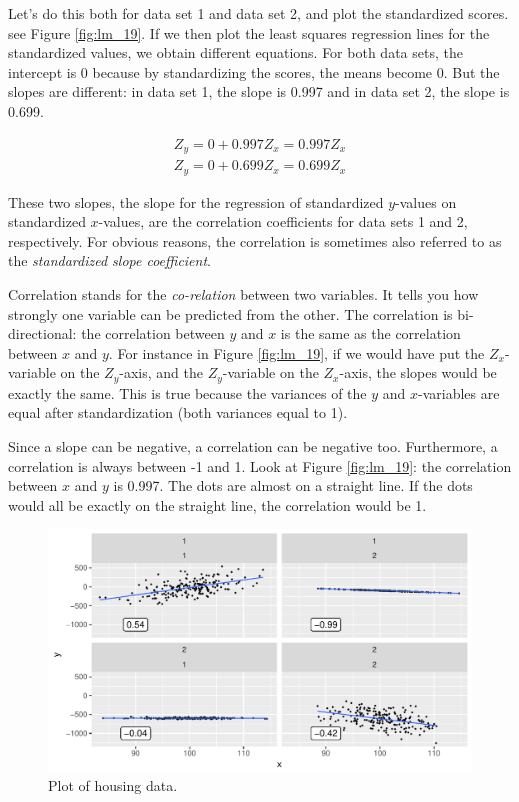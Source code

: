 \documentclass[]{report}\usepackage[]{graphicx}\usepackage[]{color}
\makeatletter
\def\maxwidth{ %
  \ifdim\Gin@nat@width>\linewidth
    \linewidth
  \else
    \Gin@nat@width
  \fi
}
\newenvironment{knitrout}{}{} %
\makeatother
\begin{document}
Let's do this both for data set 1 and data set 2, and plot the standardized scores. see Figure \ref{fig:lm_19}. If we then plot the least squares regression lines for the standardized values, we obtain different equations. For both data sets, the intercept is 0 because by standardizing the scores, the means become 0. But the slopes are different: in data set 1, the slope is 0.997 and in data set 2, the slope is 0.699.

\begin{eqnarray}
Z_y = 0 + 0.997Z_x=0.997Z_x \\
Z_y = 0 + 0.699Z_x=0.699Z_x
\end{eqnarray}


These two slopes, the slope for the regression of standardized $y$-values on standardized $x$-values, are the correlation coefficients for data sets 1 and 2, respectively. For obvious reasons, the correlation is sometimes also referred to as the \textit{standardized slope coefficient}.

Correlation stands for the \textit{co-relation} between two variables. It tells you how strongly one variable can be predicted from the other. The correlation is bi-directional: the correlation between $y$ and $x$ is the same as the correlation between $x$ and $y$. For instance in Figure \ref{fig:lm_19}, if we would have put the $Z_x$-variable on the $Z_y$-axis, and the $Z_y$-variable on the $Z_x$-axis, the slopes would be exactly the same. This is true because the variances of the $y$ and $x$-variables are equal after standardization (both variances equal to 1).

Since a slope can be negative, a correlation can be negative too. Furthermore, a correlation is always between -1 and 1. Look at Figure \ref{fig:lm_19}: the correlation between $x$ and $y$ is 0.997. The dots are almost on a straight line. If the dots would all be exactly on the straight line, the correlation would be 1.

\begin{knitrout}
\color{fgcolor}\begin{figure}

{\centering \includegraphics[width=\maxwidth]{figure/lm_20-1} 

}

\caption[Plot of housing data]{Plot of housing data.}\label{fig:lm_20}
\end{figure}


\end{knitrout}
\end{document}
